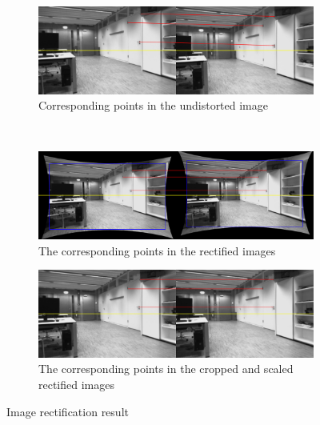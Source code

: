 \documentclass[11pt]{article}
\begin{document}
\begin{figure}[H]
        \centering
        \begin{subfigure}[b]{0.9\textwidth}
                \includegraphics[width=\textwidth]{images/undistort}
                \caption{Corresponding points in the undistorted image}
                \label{fig:rect_1}
        \end{subfigure}\\
        \begin{subfigure}[b]{0.9\textwidth}
                \includegraphics[width=\textwidth]{images/rect_uncropped}
                \caption{The corresponding points in the rectified images}
                \label{fig:rect_2}
        \end{subfigure}

        \begin{subfigure}[b]{0.9\textwidth}
                \includegraphics[width=\textwidth]{images/rect_cropped}
                \caption{The corresponding points in the cropped and scaled rectified images}
                \label{fig:rect_3}
        \end{subfigure}
         \caption{Image rectification result }\label{fig:rectification}
\end{figure}
\end{document}

